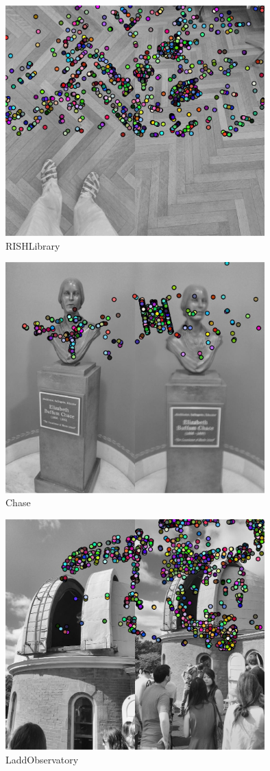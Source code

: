 \begin{figure}[h]
    \centering
    \includegraphics[width=10cm]{RISHLibrary.jpg}
    \caption{RISHLibrary}
    \label{fig:r1}
\end{figure}
\begin{figure}[h]
    \centering
    \includegraphics[width=10cm]{Chase.jpg}
    \caption{Chase}
    \label{fig:r2}
\end{figure}
\begin{figure}[h]
    \centering
    \includegraphics[width=10cm]{LaddObservatory.jpg}
    \caption{LaddObservatory}
    \label{fig:r3}
\end{figure}


